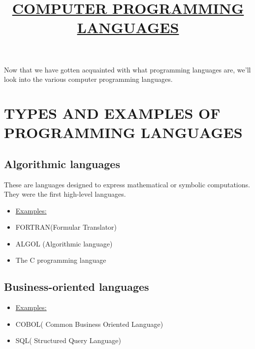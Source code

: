 \documentclass{article}
\begin{document}
	\title{\underline{\textbf{COMPUTER PROGRAMMING LANGUAGES}}}
	\maketitle
	Now that we have gotten acquainted with what programming languages are, we’ll look into the various computer programming languages.
	\section{TYPES AND EXAMPLES OF PROGRAMMING LANGUAGES}
	
	\subsection{Algorithmic languages}
   
	These are languages designed to express mathematical or symbolic computations. They were the first high-level languages.
	\begin{itemize}
	\item\underline{Examples:}
	\item FORTRAN(Formular Translator)
	\item ALGOL (Algorithmic language)
	\item The C programming language
   \end{itemize}
	
	\subsection{Business-oriented languages}
	\begin{itemize}
	\item\underline{Examples:}
	\item COBOL( Common Business Oriented Language)
	\item SQL( Structured Query Language)
	\end{itemize}
	
\end{document}
